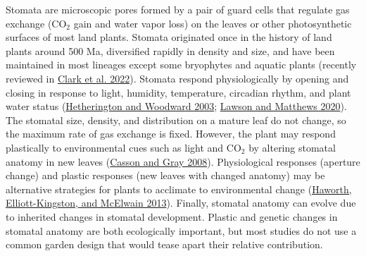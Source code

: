 \documentclass[
  12pt,
]{article}
\begin{document}
Stomata are microscopic pores formed by a pair of guard cells that regulate gas exchange (CO\(_2\) gain and water vapor loss) on the leaves or other photosynthetic surfaces of most land plants. Stomata originated once in the history of land plants around 500 Ma, diversified rapidly in density and size, and have been maintained in most lineages except some bryophytes and aquatic plants (recently reviewed in \protect\hyperlink{ref-clark_origin_2022}{Clark et al. 2022}). Stomata respond physiologically by opening and closing in response to light, humidity, temperature, circadian rhythm, and plant water status (\protect\hyperlink{ref-hetherington_role_2003}{Hetherington and Woodward 2003}; \protect\hyperlink{ref-lawson_guard_2020}{Lawson and Matthews 2020}). The stomatal size, density, and distribution on a mature leaf do not change, so the maximum rate of gas exchange is fixed. However, the plant may respond plastically to environmental cues such as light and CO\(_2\) by altering stomatal anatomy in new leaves (\protect\hyperlink{ref-casson_influence_2008}{Casson and Gray 2008}). Physiological responses (aperture change) and plastic responses (new leaves with changed anatomy) may be alternative strategies for plants to acclimate to environmental change (\protect\hyperlink{ref-haworth_co-ordination_2013}{Haworth, Elliott-Kingston, and McElwain 2013}). Finally, stomatal anatomy can evolve due to inherited changes in stomatal development. Plastic and genetic changes in stomatal anatomy are both ecologically important, but most studies do not use a common garden design that would tease apart their relative contribution.
\end{document}
